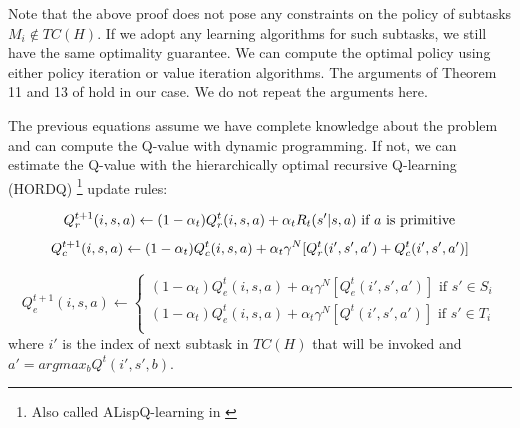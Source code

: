 Note that the above proof does not pose any constraints on the policy of subtasks $M_i \notin TC(H)$. 
If we adopt any learning algorithms for such subtasks, we still have the same optimality guarantee. 
We can compute the optimal policy using either policy iteration or value iteration algorithms. The arguments of
Theorem 11 and 13 of \cite{HORDQ} hold in our case. We do not repeat the arguments here.
 
The previous equations assume we have complete knowledge about the problem and can compute
the Q-value with dynamic programming. If not, we can estimate the Q-value with
the hierarchically optimal recursive Q-learning (HORDQ) \footnote{Also called ALispQ-learning in \cite{Andre02, HORDQ}} 
update rules:

\begin{equation}
    Q_r^{t+1}(i, s, a) \leftarrow
    (1 - \alpha_t)Q_r^t(i, s, a) + \alpha_t R_t(s'| s, a)   \mbox{ if $a$ is primitive} \\
    \label{eq:TdQr}
\end{equation}
\begin{equation}
    Q_c^{t+1}(i, s, a) \leftarrow
    (1 - \alpha_t)Q_c^t(i, s, a) + \alpha_t \gamma^N[Q_r^{t}(i', s', a') + Q_c^t(i', s', a')] \\
    \label{eq:TdQc}
\end{equation}

\begin{equation}
    Q_e^{t+1}(i, s, a) \leftarrow
    \left\{\begin{array}{ll}
    (1 - \alpha_t)Q_e^{t}(i, s, a) + \alpha_t \gamma^N[Q_e^{t}(i', s', a')]  \mbox{ if $s' \in S_i$} \\
    (1 - \alpha_t)Q_e^{t}(i, s, a) + \alpha_t \gamma^N[Q^{t}(i', s', a')]  \mbox{ if $s' \in T_i$} \\
    \end{array} \right.
    \label{eq:TdQe}
\end{equation}
where $i'$ is the index of next subtask in $TC(H)$ that will be invoked and $a' = arg max_b Q^t(i', s', b)$.

